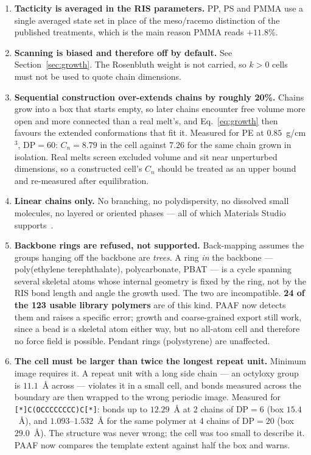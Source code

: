 \documentclass[11pt,a4paper]{article}
\begin{document}
\begin{enumerate}[label=\textbf{L\arabic*.}]
\item \textbf{Tacticity is averaged in the RIS parameters.}
PP, PS and PMMA use a single averaged state set in place of the meso/racemo
distinction of the published treatments, which is the main reason PMMA reads
$+11.8\%$.

\item \textbf{Scanning is biased and therefore off by default.}
See Section~\ref{sec:growth}. The Rosenbluth weight is not carried, so
$k>0$ cells must not be used to quote chain dimensions.

\item \textbf{Sequential construction over-extends chains by roughly 20\%.}
Chains grow into a box that starts empty, so later chains encounter free
volume more open and more connected than a real melt's, and
Eq.~\eqref{eq:growth} then favours the extended conformations that fit it.
Measured for PE at $0.85$~g/cm$^3$, $\mathrm{DP}=60$: $C_n = 8.79$ in the cell
against $7.26$ for the same chain grown in isolation. Real melts screen
excluded volume and sit near unperturbed dimensions, so a constructed cell's
$C_n$ should be treated as an upper bound and re-measured after equilibration.

\item \textbf{Linear chains only.} No branching, no polydispersity, no
dissolved small molecules, no layered or oriented phases --- all of which
Materials Studio supports~\cite{biovia,accelrys}.

\item \textbf{Backbone rings are refused, not supported.} Back-mapping assumes
the groups hanging off the backbone are \emph{trees}. A ring \emph{in} the
backbone --- poly(ethylene terephthalate), polycarbonate, PBAT --- is a cycle
spanning several skeletal atoms whose internal geometry is fixed by the ring,
not by the RIS bond length and angle the growth used. The two are
incompatible. \textbf{24 of the 123 usable library polymers} are of this kind.
PAAF now detects them and raises a specific error; growth and coarse-grained
export still work, since a bead is a skeletal atom either way, but no all-atom
cell and therefore no force field is possible. Pendant rings (polystyrene) are
unaffected.

\item \textbf{The cell must be larger than twice the longest repeat unit.}
Minimum image requires it. A repeat unit with a long side chain --- an
octyloxy group is $11.1$~\AA{} across --- violates it in a small cell, and
bonds measured across the boundary are then wrapped to the wrong periodic
image. Measured for \texttt{[*]C(OCCCCCCCC)C[*]}: bonds up to $12.29$~\AA{} at
2 chains of $\mathrm{DP}=6$ (box $15.4$~\AA), and $1.093$--$1.532$~\AA{} for
the same polymer at 4 chains of $\mathrm{DP}=20$ (box $29.0$~\AA). The
structure was never wrong; the cell was too small to describe it. PAAF now
compares the template extent against half the box and warns.


\end{enumerate}
\end{document}
